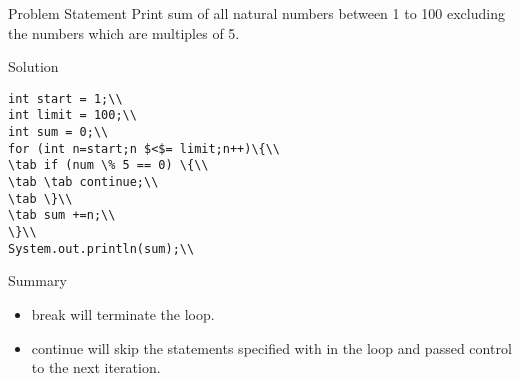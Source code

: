 \documentclass[aspectratio=169,14pt,usenames,dvipsnames]{beamer}
\newcommand\tab[1][1cm]{\hspace*{#1}}
\begin{document}
\begin{frame}{Problem Statement}
Print sum of all natural numbers between 1 to
100 excluding the numbers which are
multiples of 5.
\end{frame}

\begin{frame}{Solution}
\begin{lstlisting}
int start = 1;\\
int limit = 100;\\
int sum = 0;\\
for (int n=start;n $<$= limit;n++)\{\\
\tab if (num \% 5 == 0) \{\\
\tab \tab continue;\\
\tab \}\\
\tab sum +=n;\\
\}\\
System.out.println(sum);\\
\end{lstlisting}
\end{frame}


\begin{frame}{Summary}
\begin{itemize}
    \item break will terminate the loop.
\item continue will skip the statements specified
with in the loop and passed control to the
next iteration.
\end{itemize}
\end{frame}
\end{document}
